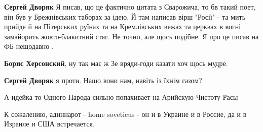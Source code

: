 \begin{itemize}
\begin{itemize}
 
\textbf{Сергей Дворяк} Я писав, що це фактично цитата з Сварожича, то бв такий поет, він був у Брежнівських таборах за ідею. Й там написав вірш "Росії" - та мить прийде й на Пітерських руїнах та на Кремлівських вежах та церквах в вогні замайорить жовто-блакитний стяг. Не точно, але щось подібне. Я про це писав на ФБ нещодавно .

 
\textbf{Борис Херсонский}, ну так має ж Зе вряди-годи казати хоч щось мудре.

 
\textbf{Сергей Дворяк} я проти. Нашо вони нам, навіть із їхнім газом?
\end{itemize}

 
А идейка то Одного Народа сильно попахивает на Арийскую Чистоту Расы

 
К сожалению, адиннарот - home soveticus - он и в Украине и в Россие, да и в Израиле и США встречается.

 


\end{itemize}
